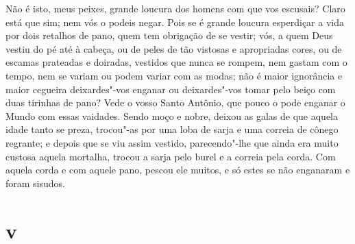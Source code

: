 Não é isto, meus peixes, grande loucura dos homens com que vos escusais?
Claro está que sim; nem vós o podeis negar. Pois se é grande loucura
esperdiçar a vida por dois retalhos de pano, quem tem obrigação de se
vestir; vós, a quem Deus vestiu do pé até à cabeça, ou de peles de tão
vistosas e apropriadas cores, ou de escamas prateadas e doiradas,
vestidos que nunca se rompem, nem gastam com o tempo, nem se variam ou
podem variar com as modas; não é maior ignorância e maior cegueira
deixardes"-vos enganar ou deixardes"-vos tomar pelo beiço com duas
tirinhas de pano? Vede o vosso Santo Antônio, que pouco o pode enganar o
Mundo com essas vaidades. Sendo moço e nobre, deixou as galas de que
aquela idade tanto se preza, trocou"-as por uma loba de sarja e uma
correia de cônego regrante; e depois que se viu assim vestido,
parecendo"-lhe que ainda era muito custosa aquela mortalha, trocou a
sarja pelo burel e a correia pela corda. Com aquela corda e com aquele
pano, pescou ele muitos, e só estes se não enganaram e foram sisudos.

\section*{v}

